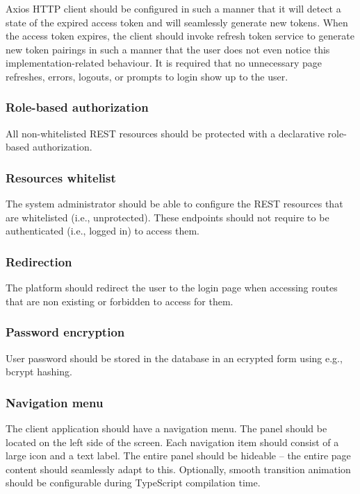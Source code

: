 \documentclass[a4paper,twoside,12pt]{book}
\begin{document}
Axios HTTP client should be configured in such a manner that it will detect a state of the expired access token and will seamlessly generate new tokens. When the access token expires, the client should invoke refresh token service to generate new token pairings in such a manner that the user does not even notice this implementation-related behaviour. It is required that no unnecessary page refreshes, errors, logouts, or prompts to login show up to the user.

\subsubsection{Role-based authorization}

All non-whitelisted REST resources should be protected with a declarative role-based authorization.

\subsubsection{Resources whitelist}

The system administrator should be able to configure the REST resources that are whitelisted (i.e., unprotected). These endpoints should not require to be authenticated (i.e., logged in) to access them.

\subsubsection{Redirection}

The platform should redirect the user to the login page when accessing routes that are non existing or forbidden to access for them.

\subsubsection{Password encryption}

User password should be stored in the database in an ecrypted form using e.g., bcrypt hashing.

\subsubsection{Navigation menu}

The client application should have a navigation menu. The panel should be located on the left side of the screen. Each navigation item should consist of a large icon and a text label. The entire panel should be hideable – the entire page content should seamlessly adapt to this. Optionally, smooth transition animation should be configurable during TypeScript compilation time.
\end{document}
